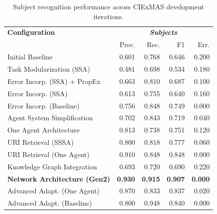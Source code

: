 \documentclass[a4paper,oneside,bibliography=totoc]{scrbook}
\begin{document}
\begin{table}[h]
  \centering
  \begin{tabular}{p{6cm}|rrrr}
    \toprule
    \textbf{Configuration}               & \multicolumn{4}{c}{\textit{\textbf{Subjects}}}                                                    \\
                                         & Prec.                                          & Rec.           & F1             & Err.           \\
    \midrule
    Initial Baseline                     & 0.601                                          & 0.768          & 0.646          & 0.200          \\
    Task Modularization (SSA)            & 0.481                                          & 0.698          & 0.534          & 0.180          \\
    Error Incorp. (SSA) + PropEx         & 0.663                                          & 0.810          & 0.687          & 0.100          \\
    Error Incorp. (SSA)                  & 0.613                                          & 0.755          & 0.640          & 0.160          \\
    Error Incorp. (Baseline)             & 0.756                                          & 0.848          & 0.749          & 0.000          \\
    Agent System Simplification          & 0.702                                          & 0.843          & 0.719          & 0.040          \\
    One Agent Architecture               & 0.813                                          & 0.738          & 0.751          & 0.120          \\
    URI Retrieval (SSSA)                 & 0.800                                          & 0.818          & 0.777          & 0.060          \\
    URI Retrieval (One Agent)            & 0.910                                          & 0.848          & 0.848          & 0.000          \\
    Knowledge Graph Integration          & 0.693                                          & 0.720          & 0.690          & 0.220          \\
    \textbf{Network Architecture (Gen2)} & \textbf{0.930}                                 & \textbf{0.915} & \textbf{0.907} & \textbf{0.000} \\
    Advanced Adapt. (One Agent)          & 0.870                                          & 0.833          & 0.837          & 0.020          \\
    Advanced Adapt. (Baseline)           & 0.800                                          & 0.948          & 0.840          & 0.000          \\
    \bottomrule
  \end{tabular}
  \caption{Subject recognition performance across CIExMAS development iterations.}
  \label{tab:evaluation_subjects_iterations}
\end{table}
\end{document}
